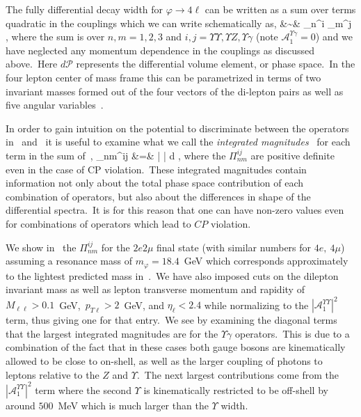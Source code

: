 \documentclass[nofootinbib,twocolumn,prl,preprintnumbers]{revtex4-1}
\begin{document}
The fully differential decay width for $\varphi\rightarrow 4\ell$ can be written as a sum over terms quadratic in the couplings which we can write schematically as,
\bea
\label{eq:diffwidth}
&\sim& \sum {}_n^{i} _{m}^{j\ast} 
\times {},
\eea
where the sum is over $n,m = 1,2,3$ and $i,j =  \Upsilon\Upsilon,  \Upsilon Z, \Upsilon\gamma$ (note $\mathcal{A}_1^{\Upsilon\gamma} = 0$) and we have neglected any momentum dependence in the couplings as discussed above.~Here $d\mathcal{P}$ represents the differential volume element, or phase space.~In the four lepton center of mass frame this can be parametrized in terms of two invariant masses formed out of the four vectors of the di-lepton pairs as well as five angular variables~\cite{Chen:2013ejz,Chen:2014pia}.

In order to gain intuition on the potential to discriminate between the operators in~ and~ it is useful to examine what we call the \emph{integrated magnitudes}~\cite{Chen:2014gka} for each term in the sum of~,
\bea
\label{eq:absdiffw}
\Pi_{nm}^{ij} &=&
\int \left|  \right| d ,
\eea
where the $\Pi_{nm}^{ij}$ are positive definite even in the case of CP violation.~These integrated magnitudes contain information not only about the total phase space contribution of each combination of operators, but also about the differences in shape of the differential spectra.~It is for this reason that one can have non-zero values even for combinations of operators which lead to $CP$ violation.

We show in~ the $\Pi_{nm}^{ij}$ for the $2e2\mu$ final state (with similar numbers for $4e,~4\mu$) assuming a resonance mass of $m_{\varphi} = 18.4$~GeV which corresponds approximately to the lightest predicted mass in~\cite{Chen:2016jxd}.~We have also imposed cuts on the dilepton invariant mass as well as lepton transverse momentum and rapidity of $M_{\ell\ell} > 0.1$~GeV,~$p_{T\ell} > 2$~GeV, and $\eta_{\ell} < 2.4$ while normalizing to the $|\mathcal{A}_1^{\Upsilon\Upsilon}|^2$ term, thus giving one for that entry.~We see by examining the diagonal terms that the largest integrated magnitudes are for the $\Upsilon\gamma$ operators.~This is due to a combination of the fact that in these cases both gauge bosons are kinematically allowed to be close to on-shell, as well as the larger coupling of photons to leptons relative to the $Z$ and $\Upsilon$.~The next largest contributions come from the $|\mathcal{A}_1^{\Upsilon\Upsilon}|^2$ term where the second $\Upsilon$ is kinematically restricted to be off-shell by around $500$~MeV which is much larger than the $\Upsilon$ width.
\end{document}
